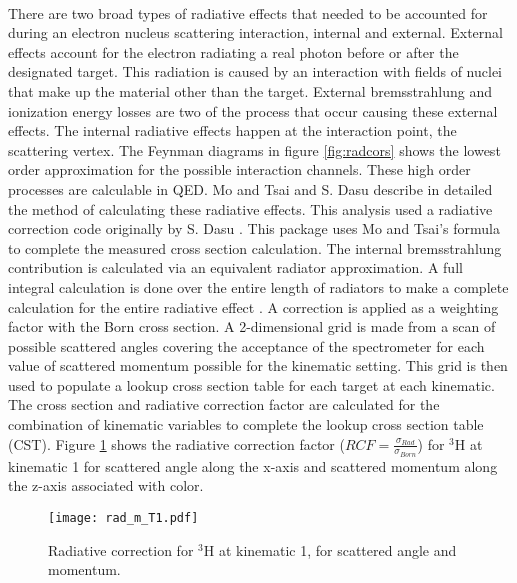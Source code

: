 \paragraph{}There are two broad types of radiative effects that needed to be accounted for during an electron nucleus scattering interaction, internal and external. External effects account for the electron radiating a real photon before or after the designated target. This radiation is caused by an interaction with fields of nuclei that make up the material other than the target. External bremsstrahlung and ionization energy losses are two of the process that occur causing these external effects. The internal radiative effects happen at the interaction point, the scattering vertex. The Feynman diagrams in figure \ref{fig:radcors} shows the lowest order approximation for the possible interaction channels. These high order processes are calculable in QED. Mo and Tsai \cite{radcors2} and S. Dasu \cite{radcors} describe in detailed the method of calculating these radiative effects. This analysis used a radiative correction code originally by S. Dasu \cite{radcors}. This package uses Mo and Tsai's formula to complete the measured cross section calculation.  The internal bremsstrahlung contribution is calculated via an equivalent radiator approximation. A full integral calculation is done over the entire length of radiators to make a complete calculation for the entire radiative effect  \cite{Ajth,radcors,radcors2,seelyth}. A correction is applied as a weighting factor with the Born cross section. A 2-dimensional grid is made from a scan of possible scattered angles covering the acceptance of the spectrometer for each value of scattered momentum possible for the kinematic setting. This grid is then used to populate a lookup cross section table for each target at each kinematic. The cross section and radiative correction factor are calculated for the combination of kinematic variables to complete the lookup cross section table (CST). Figure \ref{RCF} shows the radiative correction factor  ($RCF=\frac{\sigma_{Rad}}{\sigma_{Born}}$) for $^3$H at kinematic 1 for scattered angle along the x-axis and scattered momentum along the z-axis associated with color.  
\begin{figure}
	\texttt{[image: rad\_m\_T1.pdf]}
		\caption{Radiative correction for $^3$H at kinematic 1, for scattered angle and momentum.\label{RCF}}
\end{figure}

